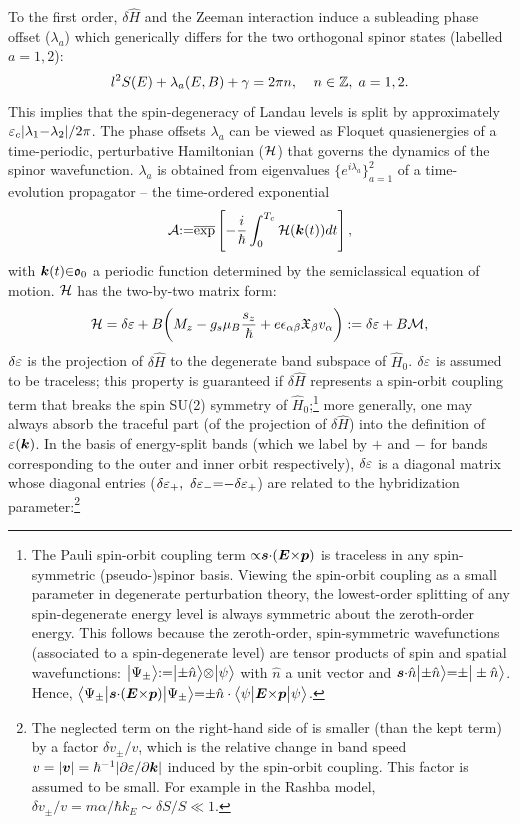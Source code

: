 \documentclass[aps, showpacs, twocolumn, notitlepage, superscriptaddress]{revtex4-1}
\begin{document}
To the first order, $\delta \hat{H}$ and the Zeeman interaction induce a subleading phase offset ($\lambda_a$) which generically differs for the two orthogonal spinor states (labelled $a{=}1,2$):
\begin{equation}
l^2S(E)+\lambda_a(E,B)+\gamma=2\pi n,\;\;\;\;  n\in \mathbb{Z},\;a=1,2. \label{eq:rule}
\end{equation}
This implies that the spin-degeneracy of Landau levels is split by approximately  $\varepsilon_c|\lambda_1{-}\lambda_2|/2\pi$. The phase offsets $\lambda_a$ can be viewed as Floquet quasienergies\cite{shirley_solution_1965} of a time-periodic, perturbative Hamiltonian (${\cal H}$) that governs the dynamics of the spinor wavefunction.  $\lambda_a$ is obtained from eigenvalues $\{e^{i\lambda_a}\}_{a=1}^2$ of a time-evolution propagator -- the time-ordered exponential 
\begin{equation}
{\cal A}{:}{=}\overline{\exp}\left[-\frac{i}{\hbar}\int_0^{T_c} {\cal H}(\boldsymbol{k}(t)) dt\right],
\label{eq:prop}
\end{equation} 
with $\boldsymbol{k}(t){\in}\mathfrak{o}_0$ a periodic function determined by the semiclassical equation of motion.   ${\cal H}$ has the two-by-two matrix form:
\begin{equation}
  {\cal H}=\delta \varepsilon +B\bigg(M_z -g_s\mu_{B}\frac{s_z}{\hbar} + e\epsilon_{\alpha\beta}\mathfrak{X}_{\beta}v_{\alpha}\bigg):=\delta \varepsilon+B{\cal M},\label{eq:H1}
\end{equation}
$\delta \varepsilon$ is the projection of $\delta \hat{H}$ to the degenerate band subspace of $\hat{H}_0$. $\delta \varepsilon$ is assumed to be traceless; this property is guaranteed if $\delta \hat{H}$ represents a spin-orbit coupling term that breaks the spin SU(2) symmetry of $\hat{H}_0$;\footnote{The Pauli spin-orbit coupling term ${\propto} \boldsymbol{s}{\cdot} (\boldsymbol{E} {\times} \boldsymbol{p})$ is traceless in any spin-symmetric (pseudo-)spinor basis.  Viewing the spin-orbit coupling as a small parameter in degenerate perturbation theory, the lowest-order splitting of any spin-degenerate energy level is always symmetric about the zeroth-order energy. This follows because the zeroth-order, spin-symmetric wavefunctions (associated to a spin-degenerate level) are tensor products of spin and spatial wavefunctions: $\big|\Psi_{\pm}\big\rangle{:}{=}\big|{\pm}\hat{n}\big\rangle{\otimes} \big|\psi\big\rangle$ with $\hat{n}$ a unit vector and  $\boldsymbol{s}{\cdot} \hat{n} \big|{\pm}\hat{n}\big\rangle{=}{\pm}\big|\pm \hat{n}\big\rangle$. Hence, $\big\langle \Psi_{\pm} \big| \boldsymbol{s}{\cdot} (\boldsymbol{E} {\times} \boldsymbol{p}) \big| \Psi_{\pm} \big\rangle{=}{\pm}\hat{n}\cdot\big\langle \psi \big| \boldsymbol{E} {\times} \boldsymbol{p} \big| \psi \big\rangle$.} more generally, one may always absorb the traceful part (of  the projection of $\delta \hat{H}$) into the definition of $\varepsilon(\boldsymbol{k})$.  In the basis of energy-split bands (which we label by ${+}$ and $-$ for bands corresponding to the outer and inner orbit respectively), $\delta \varepsilon$ is a diagonal matrix whose diagonal entries ($\delta \varepsilon_+,~\delta \varepsilon_-{=}{-}\delta \varepsilon_+$)  are related to the hybridization parameter:\footnote{The neglected term on the right-hand side of  is smaller (than the kept term) by a factor $\delta v_{\pm}/v$, which is the relative change in band speed $v=|\boldsymbol{v}|=\hbar^{-1}|\partial \varepsilon/\partial \boldsymbol{k}|$ induced by the spin-orbit coupling. This factor is assumed to be small.  For example in the Rashba model, $\delta v_{\pm}/v=m\alpha/\hbar k_E{\sim}\delta S/S{\ll}1$.}   
\end{document}
